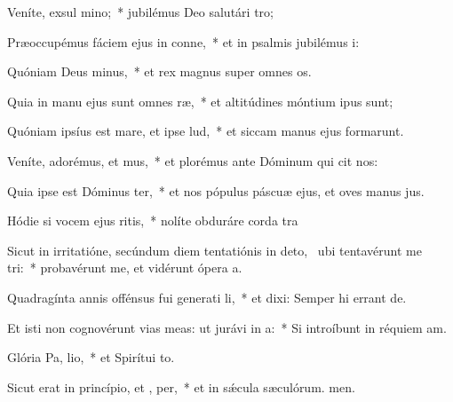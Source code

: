 \item Veníte, exsul mino;~* jubilémus Deo salutári tro;
\item Præoccupémus fáciem ejus in conne,~* et in psalmis jubilémus i:
\item Quóniam Deus  minus,~* et rex magnus super omnes os.
\item Quia in manu ejus sunt omnes  ræ,~* et altitúdines móntium ipus sunt;
\item Quóniam ipsíus est mare, et ipse  lud,~* et siccam manus ejus formarunt.
\item Veníte, adorémus, et mus,~* et plorémus ante Dóminum qui cit nos:
\item Quia ipse est Dóminus  ter,~* et nos pópulus páscuæ ejus, et oves manus jus.
\item Hódie si vocem ejus ritis,~* nolíte obduráre corda tra
\item Sicut in irritatióne, secúndum diem tentatiónis in deto,~\pscross{} ubi tentavérunt me  tri:~* probavérunt me, et vidérunt ópera a.
\item Quadragínta annis offénsus fui generati li,~* et dixi: Semper hi errant de.
\item Et isti non cognovérunt vias meas: ut jurávi in  a:~* Si introíbunt in réquiem am.
\item Glória Pa,  lio,~* et Spirítui to.
\item Sicut erat in princípio, et ,  per,~* et in sǽcula sæculórum. men.
